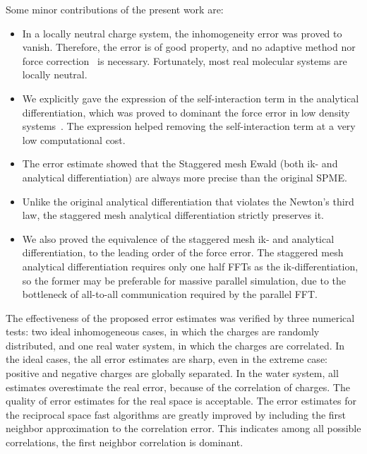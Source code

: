 \documentclass[aps,pre,preprint]{revtex4}
\begin{document}

Some minor contributions of the present work are:
\begin{itemize}
\item In a locally neutral charge system, the inhomogeneity
  error was proved to vanish. Therefore, the error
  is of good property, and no adaptive method nor
  force correction~\cite{wang2012} is necessary. Fortunately, most
  real molecular systems are locally neutral.
\item We explicitly gave the expression of the self-interaction term
  in the analytical differentiation, which was proved to dominant the
  force error in low density systems~\cite{cerutti2009staggered}.  The
  expression helped removing the self-interaction term at a very low
  computational cost.
\item The error estimate showed that the Staggered mesh Ewald
  (both ik- and analytical differentiation) are always more precise than
  the original SPME.
\item Unlike the original analytical differentiation
  that violates the Newton's third law, the staggered mesh analytical
  differentiation strictly preserves it.
\item We also proved the equivalence of the staggered mesh ik- and analytical
  differentiation, to the leading order of the force error.
  The staggered mesh analytical differentiation requires only one half
  FFTs as the ik-differentiation, so the former may be preferable
  for massive parallel simulation, due to the bottleneck of all-to-all
  communication required by the parallel FFT.
\end{itemize}

The effectiveness of the proposed error estimates was verified by
three numerical tests: two ideal inhomogeneous cases, in which the charges
are randomly distributed,
and one real water system, in which the charges are correlated.
In the ideal cases, the all error estimates are sharp, even in the extreme
case: positive and negative charges are globally separated. 
In the water system,  all estimates overestimate the real error,
because of the correlation of charges.
The quality of  error estimates for the
real space  is acceptable.
The error estimates for the reciprocal space fast algorithms
are greatly improved by including the first neighbor approximation
to the correlation error.
This indicates among all possible correlations, the first
neighbor correlation is dominant.
\end{document}
